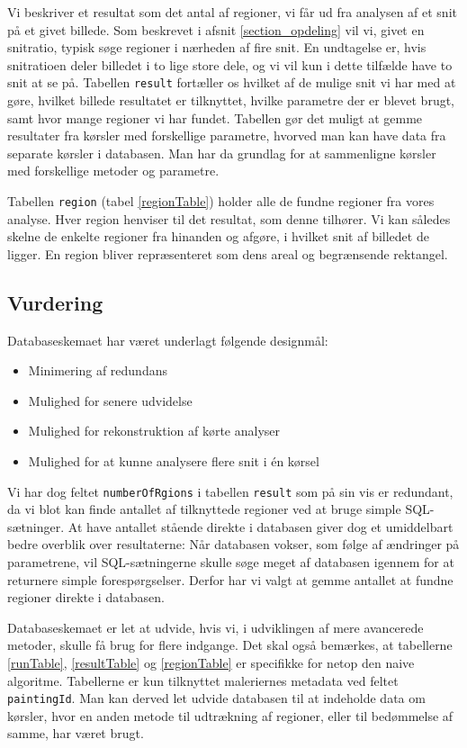 {Vi beskriver et resultat som det antal af regioner, vi får ud fra
analysen af et snit på et givet billede. Som beskrevet i afsnit
\ref{section_opdeling} vil vi, givet en snitratio, typisk søge regioner
i nærheden af fire snit. En undtagelse er, hvis snitratioen deler
billedet i to lige store dele, og vi vil kun i dette tilfælde have to
snit at se på. Tabellen \texttt{result} fortæller os hvilket af de
mulige snit vi har med at gøre, hvilket billede resultatet er
tilknyttet, hvilke parametre der er blevet brugt, samt hvor mange
regioner vi har fundet. Tabellen gør det muligt at gemme resultater fra
kørsler med forskellige parametre, hvorved man kan have data fra
separate kørsler i databasen. Man har da grundlag for at sammenligne
kørsler med forskellige metoder og parametre.

Tabellen \texttt{region} (tabel \ref{regionTable}) holder alle de fundne
regioner fra vores analyse. Hver region henviser til det resultat, som
denne tilhører. Vi kan således skelne de enkelte regioner fra hinanden
og afgøre, i hvilket snit af billedet de ligger. En region bliver
repræsenteret som dens areal og begrænsende rektangel.

\subsection{Vurdering}
Databaseskemaet har været underlagt følgende designmål:

\begin{itemize}
    \item Minimering af redundans
    \item Mulighed for senere udvidelse
    \item Mulighed for rekonstruktion af kørte analyser
    \item Mulighed for at kunne analysere flere snit i én kørsel
\end{itemize}

Vi har dog feltet \texttt{numberOfRgions} i tabellen \texttt{result} som
på sin vis er redundant, da vi blot kan finde antallet af tilknyttede
regioner ved at bruge simple SQL-sætninger. At have antallet stående
direkte i databasen giver dog et umiddelbart bedre overblik over
resultaterne: Når databasen vokser, som følge af ændringer på
parametrene, vil SQL-sætningerne skulle søge meget af databasen igennem
for at returnere simple forespørgselser. Derfor har vi valgt at gemme
antallet at fundne regioner direkte i databasen.

Databaseskemaet er let at udvide, hvis vi, i udviklingen af mere
avancerede metoder, skulle få brug for flere indgange. Det skal også
bemærkes, at tabellerne \ref{runTable}, \ref{resultTable} og
\ref{regionTable} er specifikke for netop den naive algoritme.
Tabellerne er kun tilknyttet maleriernes metadata ved feltet
\texttt{paintingId}. Man kan derved let udvide databasen til at
indeholde data om kørsler, hvor en anden metode til udtrækning af
regioner, eller til bedømmelse af samme, har været brugt.

}

